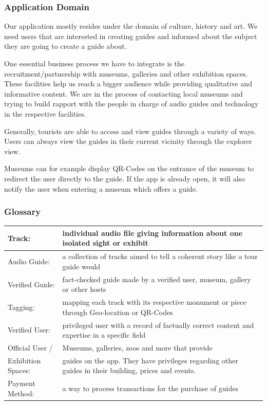 \documentclass[12pt]{article}
\theoremstyle{definition}
\newenvironment{text}{
   \setlength{\parindent}{0pt}
   \color{black}
}{}
\begin{document}
\subsubsection{Application Domain}

\begin{text}
Our application mostly resides under the domain of culture, history and art. We need users that are interested in creating guides and informed about the subject they are going to create a guide about.  

One essential business process we have to integrate is the recruitment/partnership with museums, galleries and other exhibition spaces. These facilities help us reach a bigger audience while providing qualitative and informative content. 
We are in the process of contacting local museums and trying to build rapport with the people in charge of audio guides and technology in the respective facilities.

Generally, tourists are able to access and view guides through a variety of ways. Users can always view the guides in their current vicinity through the explorer view. 

Museums can for example display QR-Codes on the entrance of the museum to redirect the user directly to the guide. If the app is already open, it will also notify the user when entering a museum which offers a guide. 
\end{text}

\subsubsection{Glossary}

\begin{tabular}{|p{.2\linewidth}|p{.65\linewidth}|}
\hline
Track: & individual audio file giving information about one isolated sight or exhibit\\
\hline 
Audio Guide: & a collection of tracks aimed to tell a coherent story like a tour guide would  \\ 
\hline 
Verified Guide: & fact-checked guide made by a verified user, museum, gallery or other hosts\\ \hline
Tagging: & mapping each track with its respective monument or piece through Geo-location or QR-Codes  \\ 
\hline 
Verified User: &  privileged user with a record of factually correct content and expertise in a specific field\\ 
\hline 
Official User /  &  Museums, galleries, zoos and more that provide \\ 
Exhibition Spaces: & guides on the app. They have privileges regarding other guides in their building, prices and events.\\ 
\hline
Payment Method: & a way to process transactions for the purchase of guides \\
\hline
\end{tabular}
\end{document}
